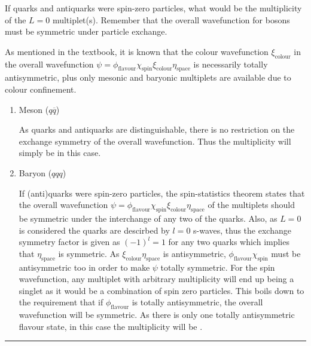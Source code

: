 \begin{problem}{9.4}
If quarks and antiquarks were spin-zero particles, what would be the multiplicity of the $L = 0$ multiplet(s). Remember that the overall wavefunction for bosons must be symmetric under particle exchange.
\end{problem}
\begin{solution}
As mentioned in the textbook, it is known that the colour wavefunction $\xi_\text{colour}$ in the  overall wavefunction $\psi=\phi_\text{flavour}\chi_\text{spin}\xi_\text{colour}\eta_\text{space}$ is necessarily totally antisymmetric, plus only mesonic and baryonic multiplets are available due to colour confinement.  
    \begin{enumerate}[label=(\roman*)]
        \item Meson ($q\overbar{q}$)
        
            As quarks and antiquarks are distinguishable, there is no restriction on the exchange symmetry of the overall wavefunction. Thus the multiplicity will simply be  in this case.
        \item Baryon ($qqq$)
        
        If (anti)quarks were spin-zero particles, the spin-statistics theorem states that the overall wavefunction $\psi=\phi_\text{flavour}\chi_\text{spin}\xi_\text{colour}\eta_\text{space}$ of the multiplets should be symmetric under the interchange of any two of the quarks. Also, as $L=0$ is considered the quarks are descirbed by $l=0$ s-waves, thus the exchange symmetry factor is given as $(-1)^l = 1$ for any two quarks which implies that $\eta_\text{space}$ is symmetric. As $\xi_\text{colour}\eta_\text{space}$ is antisymmetric, $\phi_\text{flavour}\chi_\text{spin}$ must be antisymmetric too in order to make $\psi$ totally symmetric. For the spin wavefunction, any multiplet with arbitrary multiplicity will end up being a singlet as it would be a combination of spin zero particles. This boils down to the requirement that if $\phi_\text{flavour}$ is totally antisymmetric, the overall wavefunction will be symmetric. As there is only one totally antisymmetric flavour state, in this case the multiplicity will be .
    \end{enumerate}

\end{solution}

\noindent\rule{7in}{1.5pt}


